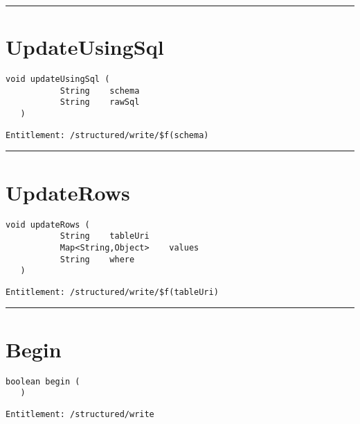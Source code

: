 \rule{12cm}{2pt}
\section{UpdateUsingSql}
\label{Api:UpdateUsingSql}
\begin{lstlisting}[style=nonumbers]
   void updateUsingSql (
           String    schema
           String    rawSql
   )
\end{lstlisting}
\begin{Verbatim}[formatcom=\color{Maroon}]
  Entitlement: /structured/write/$f(schema)
\end{Verbatim}



\rule{12cm}{2pt}
\section{UpdateRows}
\label{Api:UpdateRows}
\begin{lstlisting}[style=nonumbers]
   void updateRows (
           String    tableUri
           Map<String,Object>    values
           String    where
   )
\end{lstlisting}
\begin{Verbatim}[formatcom=\color{Maroon}]
  Entitlement: /structured/write/$f(tableUri)
\end{Verbatim}



\rule{12cm}{2pt}
\section{Begin}
\label{Api:Begin}
\begin{lstlisting}[style=nonumbers]
   boolean begin (
   )
\end{lstlisting}
\begin{Verbatim}[formatcom=\color{Maroon}]
  Entitlement: /structured/write
\end{Verbatim}



